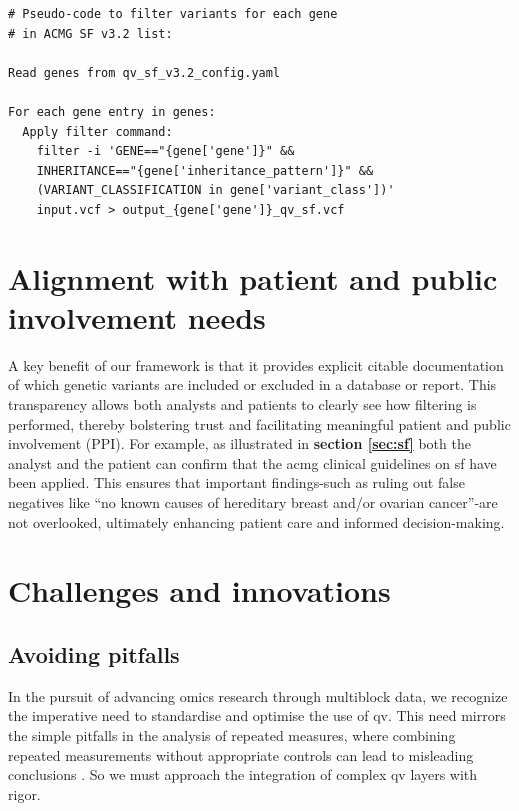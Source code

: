 \begin{tcolorbox}[
    breakable,  %
    colback=white!0,  %
    colframe=black,  %
    boxrule=1pt,  %
    arc=1mm,  %
    outer arc=1mm,
    title=\textbf{\refstepcounter{myboxcounter}\label{box:qv_variables_example_sf2}Box \themyboxcounter: Filtering command for QV SF}
]
\begin{verbatim}
# Pseudo-code to filter variants for each gene 
# in ACMG SF v3.2 list:

Read genes from qv_sf_v3.2_config.yaml

For each gene entry in genes:
  Apply filter command:
    filter -i 'GENE=="{gene['gene']}" && 
    INHERITANCE=="{gene['inheritance_pattern']}" && 
    (VARIANT_CLASSIFICATION in gene['variant_class'])' 
    input.vcf > output_{gene['gene']}_qv_sf.vcf
\end{verbatim}
\end{tcolorbox}

\section{Alignment with patient and public involvement needs}
A key benefit of our framework is that it provides explicit citable documentation of which genetic variants are included or excluded in a database or report. 
This transparency allows both analysts and patients to clearly see how filtering is performed, thereby bolstering trust and facilitating meaningful patient and public involvement (PPI). 
For example, as illustrated in 
\textbf{section \ref{sec:sf}}
 both the analyst and the patient can confirm that the \ac{acmg} clinical guidelines on \ac{sf} have been applied. 
This ensures that important findings-such as ruling out false negatives like ``no known causes of hereditary breast and/or ovarian cancer''-are not overlooked, ultimately enhancing patient care and informed decision-making.

\section{Challenges and innovations}
\subsection{Avoiding pitfalls}
In the pursuit of advancing omics research through multiblock data, we recognize the imperative need to standardise and optimise the use of \ac{qv}. 
This need mirrors the simple pitfalls in the analysis of repeated measures, where combining repeated measurements without appropriate controls can lead to misleading conclusions
\cite{bland1994correlation}.
So we must approach the integration of complex \ac{qv} layers with rigor.

